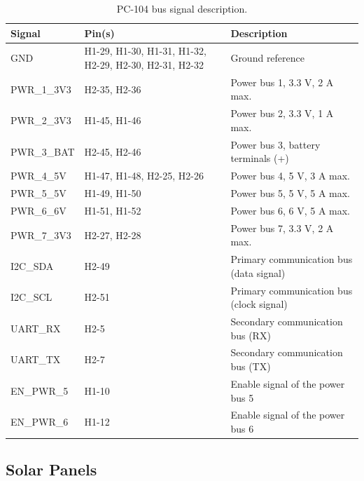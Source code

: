 \begin{table}[!h]
    \centering
    \begin{tabular}{lL{0.29\textwidth}L{0.47\textwidth}}
        \toprule[1.5pt]
        \textbf{Signal}  & \textbf{Pin(s)}            & \textbf{Description} \\
        \midrule
        GND              & H1-29, H1-30, H1-31, H1-32, H2-29, H2-30, H2-31, H2-32 & Ground reference \\
        PWR\_1\_3V3      & H2-35, H2-36               & Power bus 1, 3.3 V, 2 A max. \\
        PWR\_2\_3V3      & H1-45, H1-46               & Power bus 2, 3.3 V, 1 A max. \\
        PWR\_3\_BAT      & H2-45, H2-46               & Power bus 3, battery terminals (+) \\
        PWR\_4\_5V       & H1-47, H1-48, H2-25, H2-26 & Power bus 4, 5 V, 3 A max. \\
        PWR\_5\_5V       & H1-49, H1-50               & Power bus 5, 5 V, 5 A max. \\
        PWR\_6\_6V       & H1-51, H1-52               & Power bus 6, 6 V, 5 A max. \\
        PWR\_7\_3V3      & H2-27, H2-28               & Power bus 7, 3.3 V, 2 A max. \\
        I2C\_SDA         & H2-49                      & Primary communication bus (data signal) \\
        I2C\_SCL         & H2-51                      & Primary communication bus (clock signal) \\
        UART\_RX         & H2-5                       & Secondary communication bus (RX) \\
        UART\_TX         & H2-7                       & Secondary communication bus (TX) \\
        EN\_PWR\_5       & H1-10                      & Enable signal of the power bus 5 \\
        EN\_PWR\_6       & H1-12                      & Enable signal of the power bus 6 \\
        \bottomrule[1.5pt]
    \end{tabular}
    \caption{PC-104 bus signal description.}
    \label{tab:pc104-signals}
\end{table}

\subsection{Solar Panels}

